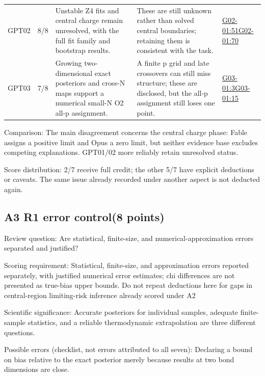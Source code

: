 \documentclass[11pt,a4paper]{article}
\begin{document}
{\begin{longtable}
{}GPT02 & 8/\allowbreak{}8 & Unstable Z4 fits and central charge remain unresolved,\allowbreak{} with the full fit family and bootstrap results. & These are still unknown rather than solved central boundaries; retaining them is consistent with the task. & \hyperref[src:G02-01]{G02-01:51}\newline \hyperref[src:G02-01]{G02-01:70}\tabularnewline
{}GPT03 & 7/\allowbreak{}8 & Growing two-dimensional exact posteriors and cross-N maps support a numerical small-N O2 all-p assignment. & A finite p grid and late crossovers can still miss structure; these are disclosed,\allowbreak{} but the all-p assignment still loses one point. & \hyperref[src:G03-01]{G03-01:3}\newline \hyperref[src:G03-01]{G03-01:15}\tabularnewline
\bottomrule
\end{longtable}
}
Comparison: The main disagreement concerns the central charge phase: Fable assigns a positive limit and Opus a zero limit,\allowbreak{} but neither evidence base excludes competing explanations. GPT01/\allowbreak{}02 more reliably retain unresolved status.

Score distribution: 2/\allowbreak{}7 receive full credit; the other 5/\allowbreak{}7 have explicit deductions or caveats. The same issue already recorded under another aspect is not deducted again.

\clearpage
\subsection{A3 R1 error control(8 points)}
\label{aspect:A3}
Review question: Are statistical,\allowbreak{} finite-size,\allowbreak{} and numerical-approximation errors separated and justified?

Scoring requirement: Statistical,\allowbreak{} finite-size,\allowbreak{} and approximation errors reported separately,\allowbreak{} with justified numerical error estimates; chi differences are not presented as true-bias upper bounds. Do not repeat deductions here for gaps in central-region limiting-risk inference already scored under A2

Scientific significance: Accurate posteriors for individual samples,\allowbreak{} adequate finite-sample statistics,\allowbreak{} and a reliable thermodynamic extrapolation are three different questions.

Possible errors (checklist,\allowbreak{} not errors attributed to all seven): Declaring a bound on bias relative to the exact posterior merely because results at two bond dimensions are close.
\end{document}
